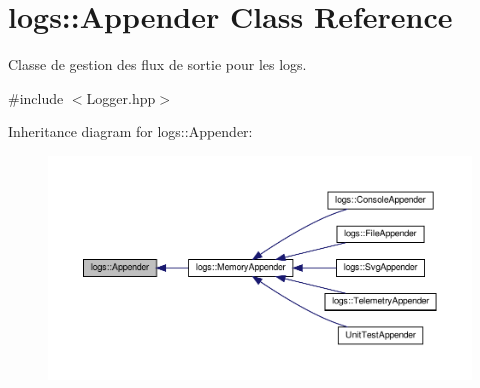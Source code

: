 \hypertarget{classlogs_1_1Appender}{}\section{logs\+:\+:Appender Class Reference}
\label{classlogs_1_1Appender}


Classe de gestion des flux de sortie pour les logs.  




{\ttfamily \#include $<$Logger.\+hpp$>$}



Inheritance diagram for logs\+:\+:Appender\+:
\nopagebreak
\begin{figure}[H]
\begin{center}
\leavevmode
\includegraphics[width=350pt]{classlogs_1_1Appender__inherit__graph}
\end{center}
\end{figure}
